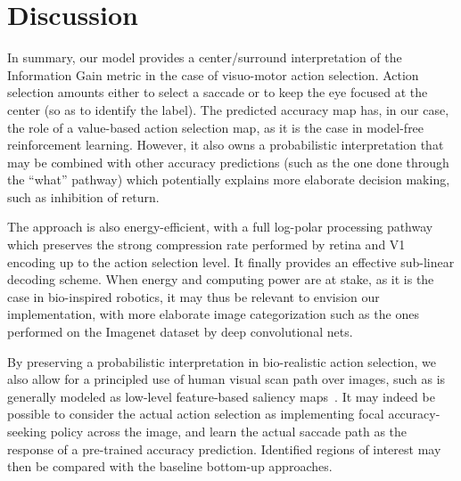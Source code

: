 \section{Discussion}
\label{sec:discussion}

In summary, our model provides a center/surround interpretation of the Information Gain metric in the case of visuo-motor action selection. Action selection amounts either to select  a saccade or to keep the eye focused at the center (so as to identify the label).
The predicted accuracy map has, in our case, the role of a value-based action selection map, as it is the case in model-free reinforcement learning. However, it also owns a probabilistic interpretation that may be combined with other accuracy predictions (such as the one done through the ``what'' pathway) which potentially explains more elaborate decision making, such as inhibition of return. 




The approach is also energy-efficient, with a full log-polar processing pathway which preserves the strong compression rate performed by retina and V1 encoding up to the action selection level. It finally provides an effective sub-linear decoding scheme. When energy and computing power are at stake, as it is the case in bio-inspired robotics, it may thus be relevant to envision our implementation, with more elaborate image categorization such as the ones performed on the Imagenet dataset by deep convolutional nets.

By preserving a probabilistic interpretation in bio-realistic action selection, we also allow for a principled use of human visual scan path over images, such as is generally modeled as low-level feature-based saliency maps~\citep{Itti01}. It may indeed be possible to consider the actual action selection as implementing focal accuracy-seeking policy across the image, and learn the actual saccade path as the response of a pre-trained accuracy prediction. Identified regions of interest may then be compared with the baseline bottom-up approaches.

